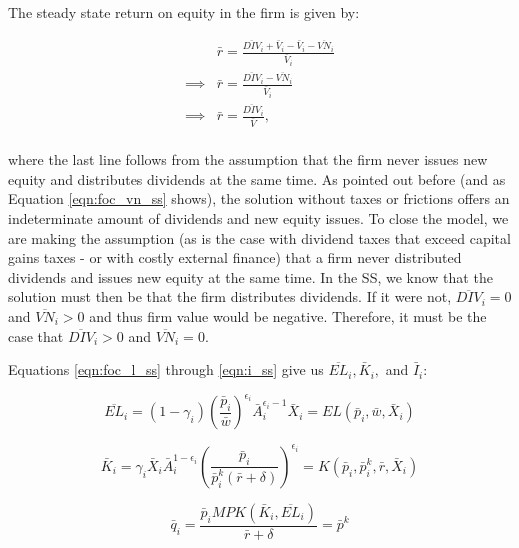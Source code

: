 \documentclass[letterpaper,12pt]{article}
\theoremstyle{definition}
\begin{document}
\begin{spacing}{1.5}
The steady state return on equity in the firm is given by:

\begin{equation}
\label{eqn:ss_return}
\begin{split}
& \bar{r} = \frac{\overline{DIV}_{i}+\bar{V}_{i}-\bar{V}_{i}-\overline{VN}_{i}}{\bar{V}_{i}}\\
\implies & \bar{r} =  \frac{\overline{DIV}_{i}-\overline{VN}_{i}}{\bar{V}_{i}}\\
\implies & \bar{r} =  \frac{\overline{DIV}_{i}}{\bar{V}},\\
\end{split}
\end{equation}

\noindent\noindent where the last line follows from the assumption that the firm never issues new equity and distributes dividends at the same time.  As pointed out before (and as Equation \ref{eqn:foc_vn_ss} shows), the solution without taxes or frictions offers an indeterminate amount of dividends and new equity issues.  To close the model, we are making the assumption (as is the case with dividend taxes that exceed capital gains taxes - or with costly external finance) that a firm never distributed dividends and issues new equity at the same time.  In the SS, we know that the solution must then be that the firm distributes dividends.  If it were not, $\overline{DIV}_{i}=0$ and $\overline{VN}_{i}>0$ and thus firm value would be negative.  Therefore, it must be the case that $\overline{DIV}_{i}>0$ and $\overline{VN}_{i}=0$.

Equations \ref{eqn:foc_l_ss} through \ref{eqn:i_ss} give us $\overline{EL}_{i}, \bar{K}_{i},$ and $\bar{I}_{i}$:

\begin{equation}
\label{eqn:l_ss}
\overline{EL}_{i} = (1-\gamma_{i}) \left( \frac{ \bar{p}_{i}}{\bar{w}}\right)^{\epsilon_{i}}\bar{A}_{i}^{\epsilon_{i}-1}\bar{X}_{i} = EL(\bar{p}_{i},\bar{w},\bar{X}_{i})
\end{equation}

\begin{equation}
\label{eqn:k_ss}
\bar{K}_{i} = \gamma_{i}\bar{X}_{i}\bar{A}_{i}^{1-\epsilon_{i}} \left(\frac{\bar{p}_{i}}{\bar{p}^{k}_{i}(\bar{r}+\delta)} \right)^{\epsilon_{i}} = K(\bar{p}_{i},\bar{p}^{k}_{i},\bar{r},\bar{X}_{i})
\end{equation}

\begin{equation}
\label{eqn:q_ss}
\bar{q}_{i} = \frac{\bar{p}_{i}MPK(\bar{K}_{i},\overline{EL}_{i})}{\bar{r}+\delta}=\bar{p}^{k}
\end{equation}


\end{spacing}
\end{document}
